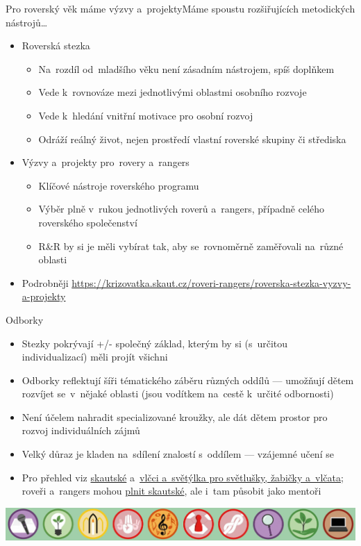 \documentclass[compress, xelatex, 11pt, xcolor=dvipsnames, print, aspectratio=169,
	hyperref={
		bookmarks=true,
		unicode=true,
		colorlinks=true,
		pdftitle={Skautska vychovna metoda},
		plainpages=false,
		pdfauthor={Vojtech Zeisek},
		pdfsubject={Skautska vychovna metoda a jeji vyvoj za posledni stoleti a desetileti},
		pdfcreator={XeLaTeX},
		pdfkeywords={Junak, Pedagogika, Skaut, Skauting, Vychovna metoda},
		linkcolor=Red, %
		anchorcolor=ForestGreen, %
		citecolor=ForestGreen, %
		filecolor=ForestGreen, %
		menucolor=ForestGreen, %
		urlcolor=Sepia, %
		pdftex},
	url={hyphens, lowtilde} %
	]{beamer}
\begin{document}
\begin{frame}{Pro roverský věk máme výzvy a~projekty}{Máme spoustu rozšiřujících metodických nástrojů\ldots}
	\begin{itemize}
		\item Roverská stezka
		\begin{itemize}
			\item Na~rozdíl od~mladšího věku není zásadním nástrojem, spíš doplňkem
			\item Vede k~rovnováze mezi jednotlivými oblastmi osobního rozvoje
			\item Vede k~hledání vnitřní motivace pro osobní rozvoj
			\item Odráží reálný život, nejen prostředí vlastní roverské skupiny či střediska
		\end{itemize}
		\item Výzvy a~projekty pro~rovery a~rangers
		\begin{itemize}
			\item Klíčové nástroje roverského programu
			\item Výběr plně v~rukou jednotlivých roverů a~rangers, případně celého roverského společenství
			\item R\&R by si je měli vybírat tak, aby se~rovnoměrně zaměřovali na~různé oblasti
		\end{itemize}
		\item Podrobněji \url{https://krizovatka.skaut.cz/roveri-rangers/roverska-stezka-vyzvy-a-projekty}
	\end{itemize}
\end{frame}

\begin{frame}{Odborky}
	\begin{itemize}
		\item Stezky pokrývají +/- společný základ, kterým by si (s~určitou individualizací) měli projít všichni
		\item Odborky reflektují šíři tématického záběru různých oddílů --- umožňují dětem rozvíjet se~v~nějaké oblasti (jsou vodítkem na~cestě k~určité odbornosti)
		\item Není účelem nahradit specializované kroužky, ale dát dětem prostor pro rozvoj individuálních zájmů
		\item Velký důraz je kladen na~sdílení znalostí s~oddílem --- vzájemné učení se
		\item Pro přehled viz \href{https://odborky.skaut.cz/}{skautské} a~\href{https://vlcciasvetylka.skaut.cz/}{vlčci a~světýlka pro světlušky, žabičky a~vlčata}; roveři a~rangers mohou \href{https://krizovatka.skaut.cz/roveri-rangers/odborky-pro-rovery-a-rangers}{plnit skautské}, ale i~tam působit jako mentoři
	\end{itemize}
	\begin{center}
		\includegraphics[width=\textwidth]{odborky.jpg}
	\end{center}
\end{frame}
\end{document}
